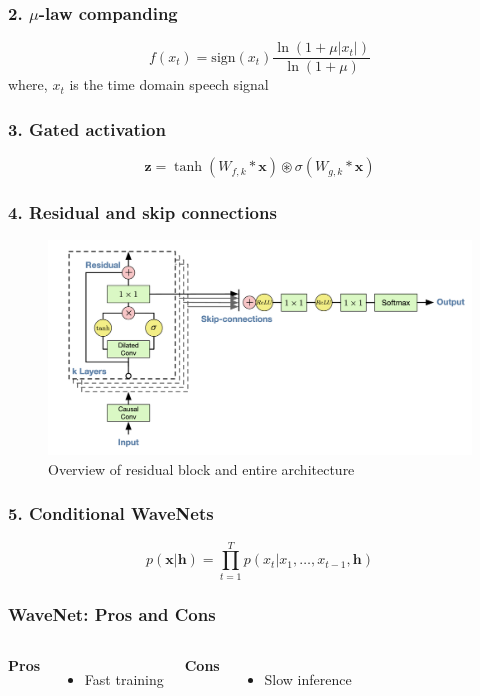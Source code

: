 \documentclass{beamer}
\begin{document}
  \begin{frame}
    \frametitle{2. $\mu$-law companding}
    \centering
    \begin{equation*}
      f(x_t) = \text{sign}(x_t)\frac{\ln(1 + \mu|x_t|)}{\ln(1 + \mu)}
    \end{equation*}
    where, $x_t$ is the time domain speech signal
  \end{frame}

  \begin{frame}
    \frametitle{3. Gated activation}
    \centering
    \begin{equation*}
      \mathbf{z} = \tanh(W_{f, k}*\mathbf{x}) \circledast \sigma (W_{g, k}*\mathbf{x})
    \end{equation*}
  \end{frame}

  \begin{frame}
    \frametitle{4. Residual and skip connections}
    \begin{figure}[ht]
      \includegraphics[width=\textwidth]{images/wavenet_arch_residual.png}
      \caption{Overview of residual block and entire architecture }
    \end{figure}
  \end{frame}

  \begin{frame}
    \frametitle{5. Conditional WaveNets}
    \begin{equation*}
      p(\mathbf{x} | \mathbf{h}) = \prod_{t=1}^{T}p(x_t | x_1, \ldots, x_{t-1}, \mathbf{h}) 
    \end{equation*}
  \end{frame}

  \begin{frame}
    \frametitle{WaveNet: Pros and Cons}
    \begin{columns}
        \textbf{Pros}
        \begin{itemize}
          \item Fast training
        \end{itemize}
        \textbf{Cons}
        \begin{itemize}
          \item Slow inference
        \end{itemize}
    \end{columns}
  \end{frame}
\end{document}
